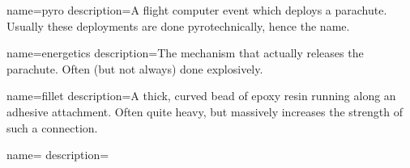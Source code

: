 {
    name=pyro
    description={A flight computer event which deploys a parachute. Usually these deployments are done pyrotechnically, hence the name.}
}

{
    name=energetics
    description={The mechanism that actually releases the parachute. Often (but not always) done explosively.}
}

{
    name=fillet
    description={A thick, curved bead of epoxy resin running along an adhesive attachment. Often quite heavy, but massively increases the strength of such a connection.}
}

\newglossaryentry{}
{
    name=
    description=
}











